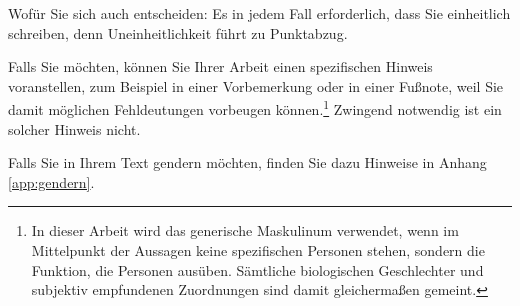 Wofür Sie sich auch entscheiden: Es in jedem Fall erforderlich, dass Sie einheitlich schreiben, denn Uneinheitlichkeit führt zu Punktabzug.

Falls Sie möchten, können Sie Ihrer Arbeit einen spezifischen Hinweis voranstellen, zum Beispiel in einer Vorbemerkung oder in einer Fußnote, weil Sie damit möglichen Fehldeutungen vorbeugen können.\footnote{In dieser Arbeit wird das generische Maskulinum verwendet, wenn im Mittelpunkt der Aussagen keine spezifischen Personen stehen, sondern die Funktion, die Personen ausüben. Sämtliche biologischen Geschlechter und subjektiv empfundenen Zuordnungen sind damit gleichermaßen gemeint.} Zwingend notwendig ist ein solcher Hinweis nicht.

Falls Sie in Ihrem Text gendern möchten, finden Sie dazu Hinweise in Anhang \ref{app:gendern}.